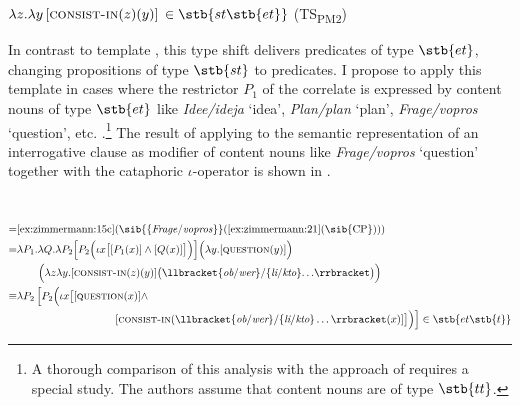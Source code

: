 \documentclass[output=paper]{langscibook}
\begin{document}
\ea\label{ex:zimmermann:21} $\lambda z . \lambda y \, [\textsc{consist-in} (z) (y)]$ $\in \stb{st\stb{et}}$ \hfill (TS\textsubscript{PM2}) \z

\noindent In contrast to template , this type shift delivers predicates of type $\stb{et}$, changing propositions of type $\stb{st}$ to predicates. I propose to apply this template in cases where the restrictor $P_1$ of the correlate is expressed by content nouns of type $\stb{et}$ like \textit{Idee/ideja} `idea', \textit{Plan/plan} `plan', \textit{Frage/vopros} `question', etc. \citep[see][]{Zimmermann2019a}.\footnote{A thorough comparison of this analysis with the approach of \citet{Fabricius-Hansen1989} requires a special study. The authors assume that content nouns are of type $\stb{tt}$.}
The result of applying  to the semantic representation of an interrogative clause as modifier of content nouns like \textit{Frage/vopros} `question' together with the cataphoric $\iota$-operator is shown in .


\ea\label{ex:zimmermann:22} \medskip\\\noindent
\begin{equation*}\begin{split}
 = & \text{\ref{ex:zimmermann:15c}(\sib{\{\textit{Frage}/\textit{vopros}\}}(\ref{ex:zimmermann:21}(\sib{CP})))}\\
 = & \lambda P_{1} . \lambda Q . \lambda P_{2} \Big[P_{2} \Big(\iota x \big[[P_{1} (x)] \wedge [Q (x)]\big]\Big)\Big] \Big(\lambda y. [\textsc{question} (y)]\Big)\\
  & \quad \quad \Big(\lambda z \lambda y. [\textsc{consist-in} (z) (y)] \big(\llbracket\{\textit{ob}/\textit{wer}\}/\{\textit{li}/\textit{kto}\} {\dots}\rrbracket\big)\Big)\\
\equiv & \lambda P_{2} \, \Big[P_{2}\Big(\iota x \big[[\textsc{question} (x)] \wedge \\
  & \hspace{3.25cm} [\textsc{consist-in} (\llbracket\{\textit{ob}/\textit{wer}\}/\{\textit{li}/\textit{kto}\} \dots\rrbracket (x)]\big]\Big)\Big] \in \stb{et\stb{t}}
\end{split}\end{equation*}
\z
\end{document}
